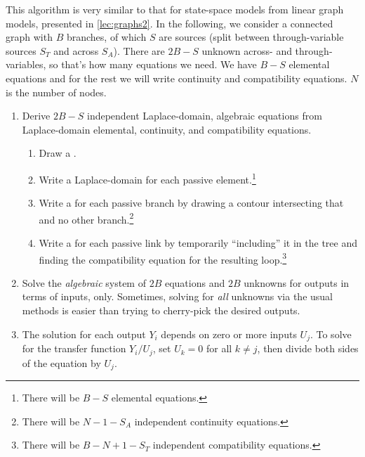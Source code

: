 \documentclass[dynamic_systems.tex]{subfiles}
\begin{document}
This algorithm is very similar to that for state-space models from linear graph models, presented in \cref{lec:graphs2}.
In the following, we consider a connected graph with $B$ branches, of which $S$ are sources (split between through-variable sources $S_T$ and across $S_A$).
There are $2 B - S$ unknown across- and through-variables, so that's how many equations we need.
We have $B-S$ elemental equations and for the rest we will write continuity and compatibility equations.
$N$ is the number of nodes.
\tags{}

\begin{enumerate}
	\item Derive $2 B-S$ independent Laplace-domain, algebraic equations from Laplace-domain elemental, continuity, and compatibility equations.
	\begin{enumerate}
		\item Draw a .
		\item Write a Laplace-domain  for each passive element.\footnote{There will be $B-S$ elemental equations.}
		\item Write a  for each passive branch by drawing a contour intersecting that and no other branch.\footnote{There will be $N - 1 - S_A$ independent continuity equations.}
		\item Write a  for each passive link by temporarily ``including'' it in the tree and finding the compatibility equation for the resulting loop.\footnote{There will be $B-N+1-S_T$ independent compatibility equations.}
	\end{enumerate}
	\item Solve the \emph{algebraic} system of $2B$ equations and $2B$ unknowns for outputs in terms of inputs, only.
	Sometimes, solving for \emph{all} unknowns via the usual methods is easier than trying to cherry-pick the desired outputs.
	\item The solution for each output $Y_i$ depends on zero or more inputs $U_j$.
	To solve for the transfer function $Y_i/U_j$, set $U_k=0$ for all $k\ne j$, then divide both sides of the equation by $U_j$.
\end{enumerate}
\end{document}
